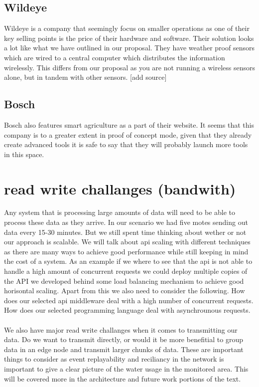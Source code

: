 \documentclass[]{uiophd}
\begin{document}
\subsection{Wildeye}
Wildeye is a company that seemingly focus on smaller operations as one of their key selling points is the price of their hardware and software. Their solution looks a lot like what we have outlined in our proposal. They have weather proof sensors which are wired to a central computer which distributes the information wirelessly. This differs from our proposal as you are not running a wireless sensors alone, but in tandem with other sensors. [add source]

\subsection{Bosch}
Bosch also features smart agriculture as a part of their website. It seems that this company is to a greater extent in proof of concept mode, given that they already create advanced tools it is safe to say that they will probably launch more tools in this space.

\section{read write challanges (bandwith)}

Any system that is processing large amounts of data will need to be able to process these data as they arrive. In our scenario we had five motes sending out data every 15-30 minutes. But we still spent time thinking about wether or not our approach is scalable. We will talk about api scaling with different techniques as there are many ways to achieve good performance while still keeping in mind the cost of a system. As an example if we where to see that the api is not able to handle a high amount of concurrent requests we could deploy multiple copies of the API we developed behind some load balancing mechanism to achieve good horisontal scaling. Apart from this we also need to consider the following. How does our selected api middleware deal with a high number of concurrent requests. How does our selected programming language deal with asynchrounous requests.
\\\\
We also have major read write challanges when it comes to transmitting our data. Do we want to transmit directly, or would it be more benefitial to group data in an edge node and transmit larger chunks of data. These are important things to consider as event replayability and reciliancy in the network is important to give a clear picture of the water usage in the monitored area. This will be covered more in the architecture and future work portions of the text.
\end{document}

